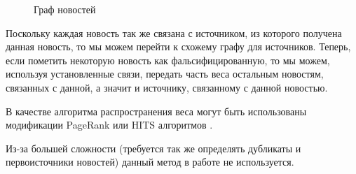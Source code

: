 \begin{figure}[h]
    \centering
    \caption{Граф новостей}
    \label{fig:news-graph}
\end{figure}

Поскольку каждая новость так же связана с источником, из которого получена данная новость, то мы можем перейти к схожему графу для источников. Теперь, если пометить некоторую новость как фальсифицированную, то мы можем, используя установленные связи, передать часть веса остальным новостям, связанных с данной, а значит и источнику, связанному с данной новостью.

В качестве алгоритма распространения веса могут быть использованы модификации PageRank или HITS алгоритмов \cite{segaran07}.

Из-за большей сложности (требуется так же определять дубликаты и первоисточники новостей) данный метод в работе не используется.
